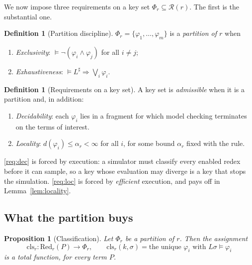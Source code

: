 \documentclass[11pt,a4paper]{article}
\theoremstyle{plain}
\newtheorem{proposition}[theorem]{Proposition}
\theoremstyle{definition}
\newtheorem{definition}[theorem]{Definition}
\theoremstyle{remark}
\newcommand{\Red}{\mathrm{Red}}
\newcommand{\dpt}{d}
\newcommand{\class}{\mathrm{cls}}
\begin{document}
We now impose three requirements on a key set $\Phi_r \subseteq \mathcal{R}(r)$. The first is the
substantial one.

\begin{definition}[Partition discipline]
\label{def:partition}
$\Phi_r = \{\varphi_1, \ldots, \varphi_m\}$ is a \emph{partition of $r$} when
\begin{enumerate}[label=(P\arabic*),leftmargin=3em]
\item \emph{Exclusivity}: $\models \neg(\varphi_i \wedge \varphi_j)$ for all $i \neq j$;
\item \emph{Exhaustiveness}: $\models L^\sharp \Rightarrow \bigvee_{i} \varphi_i$.
\end{enumerate}
\end{definition}

\begin{definition}[Requirements on a key set]
\label{def:reqs}
A key set is \emph{admissible} when it is a partition and, in addition:
\begin{enumerate}[label=(R\arabic*),leftmargin=3em]
\item\label{req:dec} \emph{Decidability}: each $\varphi_i$ lies in a fragment for which model
checking terminates on the terms of interest.
\item\label{req:loc} \emph{Locality}: $\dpt(\varphi_i) \le \alpha_r < \infty$ for all $i$, for some
bound $\alpha_r$ fixed with the rule.
\end{enumerate}
\end{definition}

\ref{req:dec} is forced by execution: a simulator must classify every enabled redex before it can
sample, so a key whose evaluation may diverge is a key that stops the simulation. \ref{req:loc} is
forced by \emph{efficient} execution, and pays off in Lemma~\ref{lem:locality}.

\subsection{What the partition buys}

\begin{proposition}[Classification]
\label{prop:classify}
Let $\Phi_r$ be a partition of $r$. Then the assignment
\[
\class_r : \Red_r(P) \longrightarrow \Phi_r,
\qquad
\class_r(k, \sigma) = \text{the unique } \varphi_i \text{ with } L\sigma \models \varphi_i
\]
is a total function, for every term $P$.
\end{proposition}
\end{document}
